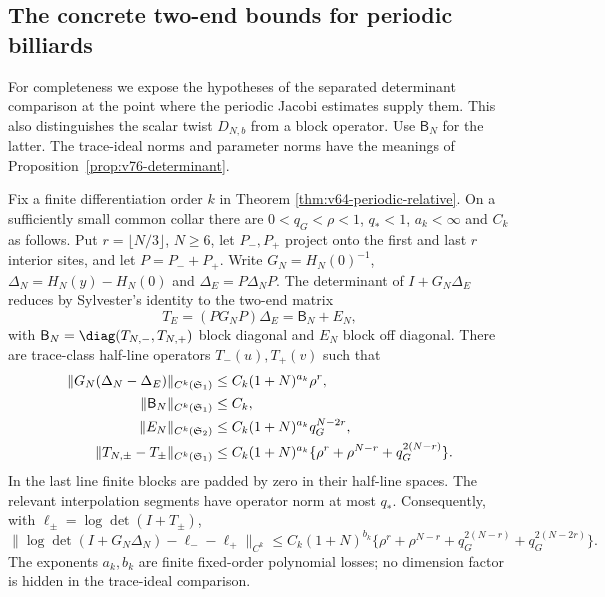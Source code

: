 \subsection{The concrete two-end bounds for periodic billiards}
\label{sec:v77-determinant-bridge}

For completeness we expose the hypotheses of the separated determinant
comparison at the point where the periodic Jacobi estimates supply them.
This also distinguishes the scalar twist $D_{N,b}$ from a block operator.
Use $\mathsf B_N$ for the latter.  The trace-ideal norms and parameter
norms have the meanings of Proposition~\ref{prop:v76-determinant}.

\begin{corollary}
\label{cor:v77-periodic-blocks}
Fix a finite differentiation order $k$ in Theorem
\ref{thm:v64-periodic-relative}.  On a sufficiently small common collar
there are $0<q_G<\rho<1$, $q_*<1$, $a_k<\infty$ and $C_k$ as
follows.  Put $r=\lfloor N/3\rfloor$, $N\ge6$, let $P_-,P_+$
project onto the first and last $r$ interior sites, and let $P=P_-+P_+$.
Write $G_N=H_N(0)^{-1}$, $\Delta_N=H_N(y)-H_N(0)$ and
$\Delta_E=P\Delta_NP$.  The determinant of
$I+G_N\Delta_E$ reduces by Sylvester's identity to the two-end matrix
\[
 T_E=(PG_NP)\Delta_E=\mathsf B_N+E_N,
\]
with $\mathsf B_N=\diag(T_{N,-},T_{N,+})$ block diagonal and $E_N$ block off diagonal.
There are trace-class half-line operators $T_-(u),T_+(v)$ such that
\begin{align}
 \|G_N(\Delta_N-\Delta_E)\|_{C^k(\mathfrak S_1)}
       &\le C_k(1+N)^{a_k}\rho^r,\label{eq:v77-middle-rate}\\
 \|\mathsf B_N\|_{C^k(\mathfrak S_1)}&\le C_k,\notag\\
 \|E_N\|_{C^k(\mathfrak S_2)}
       &\le C_k(1+N)^{a_k}q_G^{N-2r},\label{eq:v77-cross-rate}\\
 \|T_{N,\pm}-T_\pm\|_{C^k(\mathfrak S_1)}
       &\le C_k(1+N)^{a_k}
          \{\rho^r+\rho^{N-r}+q_G^{2(N-r)}\}.
       \label{eq:v77-diagonal-rate}
\end{align}
In the last line finite blocks are padded by zero in their half-line
spaces.  The relevant interpolation segments have operator norm at most
$q_*$.  Consequently, with $\ell_\pm=\log\det(I+T_\pm)$,
\begin{equation}\label{eq:v77-concrete-determinant}
 \|\log\det(I+G_N\Delta_N)-\ell_--\ell_+\|_{C^k}
 \le C_k(1+N)^{b_k}
       \{\rho^r+\rho^{N-r}+q_G^{2(N-r)}+q_G^{2(N-2r)}\}.
\end{equation}
The exponents $a_k,b_k$ are finite fixed-order polynomial losses;
no dimension factor is hidden in the trace-ideal comparison.
\end{corollary}
